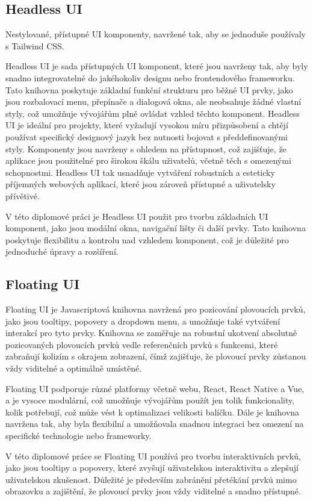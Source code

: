 \subsection{Headless UI}
Nestylované, přístupné UI komponenty, navržené tak, aby se jednoduše používaly s Tailwind CSS. \cite{HeadlessUI}

Headless UI je sada přístupných UI komponent, které jsou navrženy tak, aby byly snadno integrovatelné do jakéhokoliv designu nebo frontendového frameworku. Tato knihovna poskytuje základní funkční strukturu pro běžné UI prvky, jako jsou rozbalovací menu, přepínače a dialogová okna, ale neobsahuje žádné vlastní styly, což umožňuje vývojářům plně ovládat vzhled těchto komponent. Headless UI je ideální pro projekty, které vyžadují vysokou míru přizpůsobení a chtějí používat specifický designový jazyk bez nutnosti bojovat s předdefinovanými styly. Komponenty jsou navrženy s ohledem na přístupnost, což zajišťuje, že aplikace jsou použitelné pro širokou škálu uživatelů, včetně těch s omezenými schopnostmi. Headless UI tak usnadňuje vytváření robustních a esteticky příjemných webových aplikací, které jsou zároveň přístupné a uživatelsky přívětivé.

V této diplomové práci je Headless UI použit pro tvorbu základních UI komponent, jako jsou modální okna, navigační lišty či další prvky. Tato knihovna poskytuje flexibilitu a kontrolu nad vzhledem komponent, což je důležité pro jednoduché úpravy a rozšíření.

\subsection{Floating UI}
Floating UI je Javascriptová knihovna navržená pro pozicování plovoucích prvků, jako jsou tooltipy, popovery a dropdown menu, a umožňuje také vytváření interakcí pro tyto prvky. Knihovna se zaměřuje na robustní ukotvení absolutně pozicovaných plovoucích prvků vedle referenčních prvků s funkcemi, které zabraňují kolizím s okrajem zobrazení, čímž zajišťuje, že plovoucí prvky zůstanou vždy viditelné a optimálně umístěné.

Floating UI podporuje různé platformy včetně webu, React, React Native a Vue, a je vysoce modulární, což umožňuje vývojářům použít jen tolik funkcionality, kolik potřebují, což může vést k optimalizaci velikosti balíčku. Dále je knihovna navržena tak, aby byla flexibilní a umožňovala snadnou integraci bez omezení na specifické technologie nebo frameworky. \cite{FloatingUI}

V této diplomové práce se Floating UI používá pro tvorbu interaktivních prvků, jako jsou tooltipy a popovery, které zvyšují uživatelskou interaktivitu a zlepšují uživatelskou zkušenost. Důležité je především zabránění přetékání prvků mimo obrazovku a zajištění, že plovoucí prvky jsou vždy viditelné a snadno přístupné.

